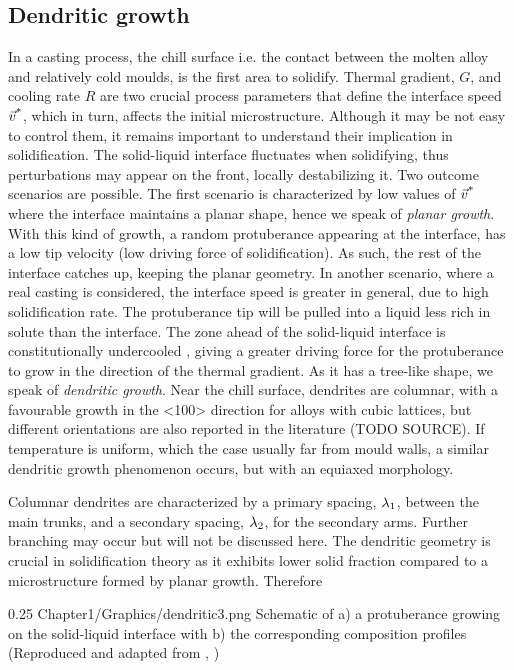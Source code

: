 \subsection{Dendritic growth}
In a casting process, the chill surface i.e. the contact between the molten alloy and relatively cold moulds, is the first area to solidify. 
Thermal gradient, $G$, and cooling rate $R$ are two crucial process parameters that define the interface speed $\vec{v}^\text{*}$, which in turn,
affects the initial microstructure. Although it may be not easy to control them, it remains important to understand their implication in solidification.
The solid-liquid interface fluctuates when solidifying, thus perturbations may appear on the front, locally destabilizing it. 
Two outcome scenarios are possible.
The first scenario is characterized by low values of $\vec{v}^\text{*}$ where the interface maintains a planar shape, hence we speak of \emph{planar growth}. 
With this kind of growth, a random protuberance appearing at the interface, has a low tip velocity (low driving force of solidification). As such,
the rest of the interface catches up, keeping the planar geometry.
In another scenario, where a real casting is considered, the interface speed is greater in general, due to high solidification rate.
The protuberance tip will be pulled into a liquid less rich in solute than the interface. The zone ahead of the solid-liquid interface is constitutionally undercooled \citep{tiller_redistribution_1953}, giving a greater driving force for the protuberance to grow in the direction
of the thermal gradient. As it has a tree-like shape, we speak of \emph{dendritic growth}. Near the chill surface, dendrites are columnar, with a 
favourable growth in the <100> direction for alloys with cubic lattices, but different orientations are also reported in the literature (TODO SOURCE). %
If temperature is uniform, which the case usually far from mould walls, a similar dendritic growth phenomenon occurs, but with an equiaxed morphology.

Columnar dendrites are characterized by a primary spacing, ${\lambda}_{1}$, between the main trunks, and a secondary spacing, ${\lambda}_{2}$, for the secondary arms.
Further branching may occur but will not be discussed here.
The dendritic geometry is crucial in solidification theory as it exhibits lower solid fraction compared to a microstructure formed by planar growth.
Therefore 

\begin{figureth}
{0.25}
{Chapter1/Graphics/dendritic3.png}
{Schematic of a) a protuberance growing on the solid-liquid interface with b) the corresponding composition profiles 
(Reproduced and adapted from \citet{doitpoms_dissemination_2000}, \doitpoms)}
\label{fig:dendritic_growth}
\end{figureth}
